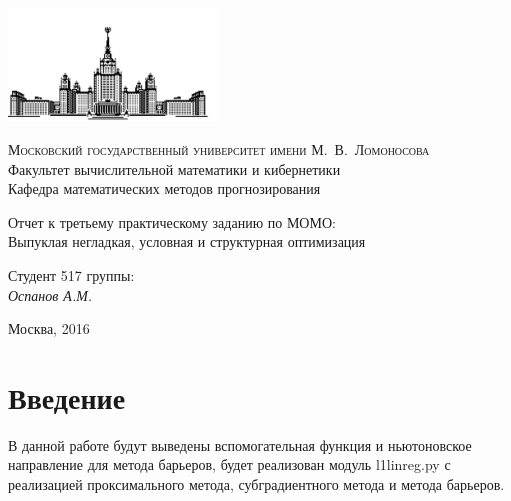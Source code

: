 \documentclass[12pt, a4paper]{article}
\begin{document}
    \thispagestyle{empty}

    \begin{singlespace}
    \begin{titlepage}
        \begin{center}
            \includegraphics[height = 3cm]{msu.png}

            {\scshape Московский государственный университет имени М.~В.~Ломоносова}\\
            Факультет вычислительной математики и кибернетики\\
            Кафедра математических методов прогнозирования\\
            \centerline{\hfill\hrulefill\hrulefill\hrulefill\hrulefill\hfill}

            \vfill

            {\LARGE Отчет к третьему практическому заданию по МОМО: \\ Выпуклая негладкая, условная и структурная оптимизация}

            \vspace{1cm}

        \end{center}

        \vfill

        \begin{flushright}
            Студент 517 группы:\\
                \textit{Оспанов А.М.}

            \vspace{5mm}

        \end{flushright}

        \vfill

        \begin{center}
            Москва, 2016
        \end{center}
    \end{titlepage}
    \end{singlespace}

    \newpage


    \section{Введение}
    В данной работе будут выведены вспомогательная функция и ньютоновское направление для метода барьеров, будет реализован модуль l1linreg.py
    с реализацией проксимального метода, субградиентного метода и метода барьеров.
\end{document}
